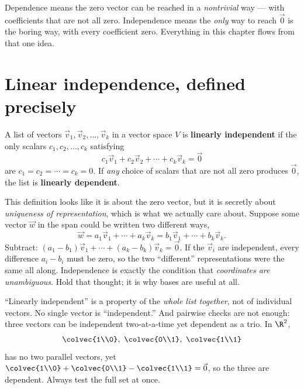 \begin{focusbox}
Dependence means the zero vector can be reached in a \emph{nontrivial} way ---
with coefficients that are not all zero. Independence means the \emph{only} way
to reach $\vec{0}$ is the boring way, with every coefficient zero. Everything in
this chapter flows from that one idea.
\end{focusbox}

\section{Linear independence, defined precisely}
\label{ch14:def}

\begin{definition}
\label{ch14:def-indep}
A list of vectors $\vec{v}_1, \vec{v}_2, \dots, \vec{v}_k$ in a vector space $V$
is \textbf{linearly independent} if the only scalars $c_1, c_2, \dots, c_k$
satisfying
\[
  c_1 \vec{v}_1 + c_2 \vec{v}_2 + \cdots + c_k \vec{v}_k = \vec{0}
\]
are $c_1 = c_2 = \cdots = c_k = 0$. If \emph{any} choice of scalars that are not
all zero produces $\vec{0}$, the list is \textbf{linearly dependent}.
\end{definition}

This definition looks like it is about the zero vector, but it is secretly about
\emph{uniqueness of representation}, which is what we actually care about.
Suppose some vector $\vec{w}$ in the span could be written two different ways,
\[
  \vec{w} = a_1\vec{v}_1 + \cdots + a_k\vec{v}_k
        = b_1\vec{v}_1 + \cdots + b_k\vec{v}_k .
\]
Subtract: $(a_1-b_1)\vec{v}_1 + \cdots + (a_k-b_k)\vec{v}_k = \vec{0}$. If the
$\vec{v}_i$ are independent, every difference $a_i - b_i$ must be zero, so the
two ``different'' representations were the same all along. Independence is
exactly the condition that \emph{coordinates are unambiguous}. Hold that thought;
it is why bases are useful at all.

\begin{trapbox}
``Linearly independent'' is a property of the \emph{whole list together}, not of
individual vectors. No single vector is ``independent.'' And pairwise checks are
not enough: three vectors can be independent two-at-a-time yet dependent as a
trio. In $\R^2$,
\[
  \colvec{1\\0},\ \colvec{0\\1},\ \colvec{1\\1}
\]
has no two parallel vectors, yet $\colvec{1\\0}+\colvec{0\\1}-\colvec{1\\1}=\vec{0}$,
so the three are dependent. Always test the full set at once.
\end{trapbox}

